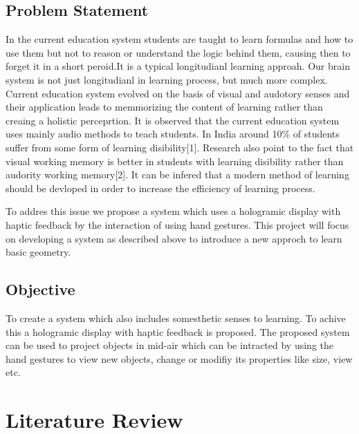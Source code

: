\documentclass{fisatproject}
\begin{document}
\section{Problem Statement}

\par In the current education system students are taught to learn formulas and how to use them but not to reason or understand the logic behind them, causing then to forget it in a short peroid.It is a typical longitudianl learning approah. Our brain system is not just longitudianl in learning process, but much more complex. Current education system evolved on the basis of visual and audotory senses and their application leads to memmorizing the content of learning rather than creaing a holistic perceprtion.
It is observed that the current education system  uses mainly audio methods to teach students.
In India around 10\% of students suffer from some form of learning disibility[1]. Research also point to the fact that visual working memory is better in students with learning disibility rather than audority working memory[2].
It can be infered that a modern method of learning should be devloped in order to increase the efficiency of learning process.

\par To addres this issue  we propose a system which uses a hologramic display with haptic feedback by the interaction of using hand gestures. This project will focus on developing a system as described above to introduce a new approch to learn basic geometry.

\section{Objective}

To create a system which also includes somesthetic senses to learning. To achive this a hologramic display with haptic feedback is proposed. The proposed system can be used to project objects in mid-air which can be intracted by using the hand gestures to view new objects, change or modifiy its properties like size, view etc.

\chapter{Literature Review}
\end{document}
